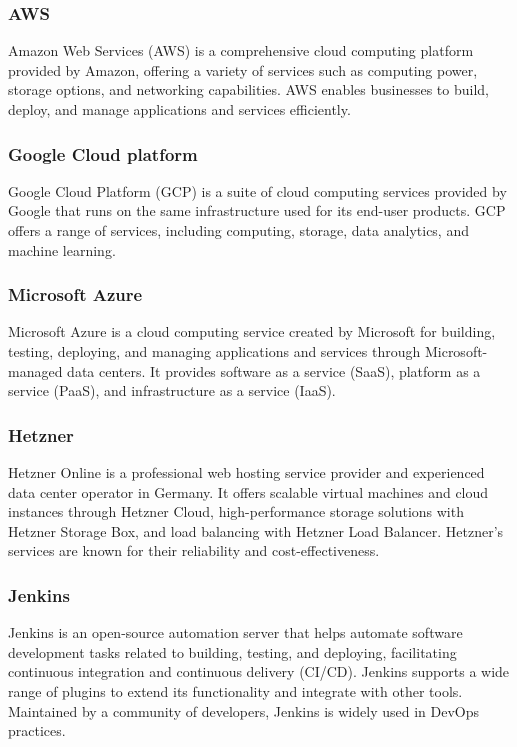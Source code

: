 \subsubsection{AWS}
Amazon Web Services (AWS) is a comprehensive cloud computing platform provided by Amazon, offering a variety of services such as computing power, storage options, and networking capabilities. AWS enables businesses to build, deploy, and manage applications and services efficiently.

\subsubsection{Google Cloud platform}
Google Cloud Platform (GCP) is a suite of cloud computing services provided by Google that runs on the same infrastructure used for its end-user products. GCP offers a range of services, including computing, storage, data analytics, and machine learning.

\subsubsection{Microsoft Azure}
Microsoft Azure is a cloud computing service created by Microsoft for building, testing, deploying, and managing applications and services through Microsoft-managed data centers. It provides software as a service (SaaS), platform as a service (PaaS), and infrastructure as a service (IaaS).

\subsubsection{Hetzner}
Hetzner Online is a professional web hosting service provider and experienced data center operator in Germany. It offers scalable virtual machines and cloud instances through Hetzner Cloud, high-performance storage solutions with Hetzner Storage Box, and load balancing with Hetzner Load Balancer. Hetzner's services are known for their reliability and cost-effectiveness.

\subsubsection{Jenkins}
Jenkins is an open-source automation server that helps automate software development tasks related to building, testing, and deploying, facilitating continuous integration and continuous delivery (CI/CD). Jenkins supports a wide range of plugins to extend its functionality and integrate with other tools. Maintained by a community of developers, Jenkins is widely used in DevOps practices.

